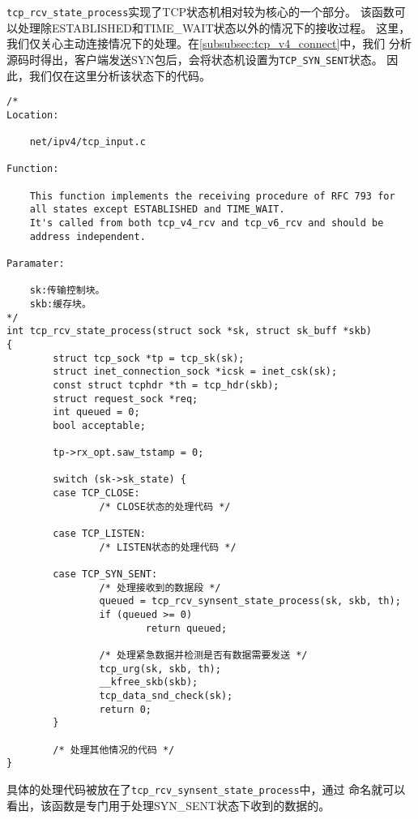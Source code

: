 \texttt{tcp_rcv_state_process}实现了TCP状态机相对较为核心的一个部分。
该函数可以处理除ESTABLISHED和TIME\_WAIT状态以外的情况下的接收过程。
这里，我们仅关心主动连接情况下的处理。在\ref{subsubsec:tcp_v4_connect}中，我们
分析源码时得出，客户端发送SYN包后，会将状态机设置为\texttt{TCP_SYN_SENT}状态。
因此，我们仅在这里分析该状态下的代码。

\begin{verbatim}
/*
Location:

	net/ipv4/tcp_input.c

Function:

	This function implements the receiving procedure of RFC 793 for
	all states except ESTABLISHED and TIME_WAIT.
	It's called from both tcp_v4_rcv and tcp_v6_rcv and should be
	address independent.

Paramater:

	sk:传输控制块。
	skb:缓存块。
*/
int tcp_rcv_state_process(struct sock *sk, struct sk_buff *skb)
{
        struct tcp_sock *tp = tcp_sk(sk);
        struct inet_connection_sock *icsk = inet_csk(sk);
        const struct tcphdr *th = tcp_hdr(skb);
        struct request_sock *req;
        int queued = 0;
        bool acceptable;

        tp->rx_opt.saw_tstamp = 0;

        switch (sk->sk_state) {
        case TCP_CLOSE:
                /* CLOSE状态的处理代码 */

        case TCP_LISTEN:
                /* LISTEN状态的处理代码 */

        case TCP_SYN_SENT:
                /* 处理接收到的数据段 */
                queued = tcp_rcv_synsent_state_process(sk, skb, th);
                if (queued >= 0)
                        return queued;

                /* 处理紧急数据并检测是否有数据需要发送 */
                tcp_urg(sk, skb, th);
                __kfree_skb(skb);
                tcp_data_snd_check(sk);
                return 0;
        }

        /* 处理其他情况的代码 */
}
\end{verbatim}

具体的处理代码被放在了\texttt{tcp_rcv_synsent_state_process}中，通过
命名就可以看出，该函数是专门用于处理SYN\_SENT状态下收到的数据的。

